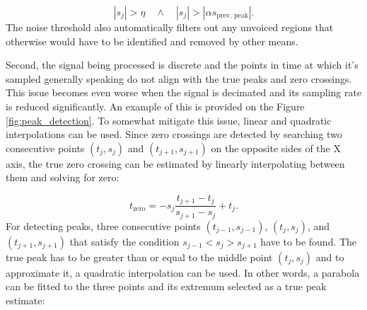 \documentclass[a4paper]{article}
\begin{document}
\begin{equation}\label{eqn:peak_criterion}
    |s_j| > \eta \quad \land \quad |s_j| > |\alpha s_{\text{prev. peak}}|.
\end{equation}
The noise threshold also automatically filters out any unvoiced regions that otherwise would have to be identified and removed by other means.

Second, the signal being processed is discrete and the points in time at which it's sampled generally speaking do not align with the true peaks and zero crossings. This issue becomes even worse when the signal is decimated and its sampling rate is reduced significantly. An example of this is provided on the Figure \ref{fig:peak_detection}. To somewhat mitigate this issue, linear and quadratic interpolations can be used. Since zero crossings are detected by searching two consecutive points $(t_j, s_j)$ and $(t_{j+1}, s_{j+1})$ on the opposite sides of the X axis, the true zero crossing can be estimated by linearly interpolating between them and solving for zero:

\begin{equation}\label{eqn:zero_crossing}
    t_\text{zero} = -s_j\frac{t_{j+1} - t_j}{s_{j+1} - s_j} + t_j.
\end{equation}
For detecting peaks, three consecutive points $(t_{j-1}, s_{j-1})$, $(t_j, s_j)$, and $(t_{j+1}, s_{j+1})$ that satisfy the condition $ s_{j-1} < s_j > s_{j+1} $ have to be found. The true peak has to be greater than or equal to the middle point $(t_j, s_j)$ and to approximate it, a quadratic interpolation can be used. In other words, a parabola can be fitted to the three points and its extremum selected as a true peak estimate:
\end{document}
